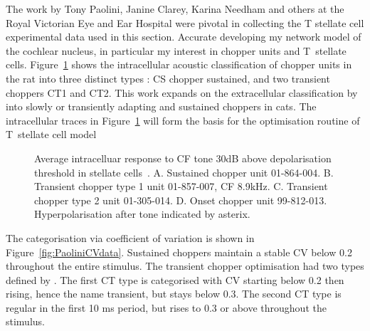 

The work by Tony Paolini, Janine Clarey, Karina Needham and others at the Royal
Victorian Eye and Ear Hospital were pivotal in collecting the T stellate cell
experimental data used in this section.  Accurate developing my network model of
the cochlear nucleus, in particular my interest in chopper units and T~stellate
cells.  Figure~\ref{fig:PaoliniAIV} shows the intracellular acoustic
classification of chopper units in the rat into three distinct types
\citep{PaoliniClareyEtAl:2005}: CS chopper sustained, and two transient choppers
CT1 and CT2.  This work expands on the extracellular classification by
\citep{BlackburnSachs:1989} into slowly or transiently adapting and sustained
choppers in cats. The intracellular traces in Figure~\ref{fig:PaoliniAIV} will
form the basis for the optimisation routine of T~stellate cell model


\begin{figure}[htb]
  \centering
{}\hfill%
\hfill%
\caption[Average intracelluar response data in stellate cells in rats.]{Average
  intracelluar response to CF tone 30dB above depolarisation threshold in
  stellate
  cells~\citep[Reproduced~from~][]{PaoliniClareyEtAl:2005}. A. Sustained chopper
  unit 01-864-004. B. Transient chopper type 1 unit 01-857-007, CF
  8.9kHz. C. Transient chopper type 2 unit 01-305-014. D. Onset chopper unit
  99-812-013. Hyperpolarisation after tone indicated by
  asterix.  \label{fig:PaoliniAIV}}
\end{figure}



The categorisation via coefficient of variation is shown in
Figure~\ref{fig:PaoliniCVdata}. Sustained choppers maintain a stable CV below 0.2
throughout the entire stimulus. The transient chopper optimisation had two types
defined by \citep{PaoliniClareyEtAl:2005}.  The first CT type is categorised
with CV starting below 0.2 then rising, hence the name transient, but stays
below 0.3.  The second CT type is regular in the first 10 ms period, but rises
to 0.3 or above throughout the stimulus.

